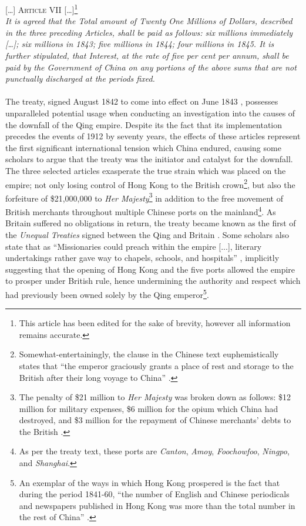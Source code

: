 \documentclass{article}
\newcommand{\textrule}{\noindent\makebox[\linewidth]{\rule{\linewidth}{0.4pt}}}
\begin{document}
{\centering \textsc{[\ldots] Article VII [\ldots]}\footnote{This article has been edited for the sake of brevity, however all information remains accurate.} \\[1em]}
\textit{It is agreed that the Total amount of Twenty One Millions of Dollars, described in the three preceding Articles, shall be paid as follows: six millions immediately \emph{[\ldots]}; six millions in 1843; five millions in 1844; four millions in 1845. It is further stipulated, that Interest, at the rate of five per cent per annum, shall be paid by the Government of China on any portions of the above sums that are not punctually discharged at the periods fixed.} \\[0.6em]
\textrule \\

The treaty, signed  August 1842 to come into effect on  June 1843
\autocite{Wright:2007}, possesses unparalleled potential usage when conducting an investigation into the causes of the downfall of the Qing empire. Despite its the fact that its implementation precedes the events of 1912 by seventy years, the effects of these articles represent the first significant international tension which China endured, causing some scholars to argue that the treaty was the initiator and catalyst for the downfall. The three selected articles exasperate the true strain which was placed on the empire; not only losing control of Hong Kong to the British crown\footnote{Somewhat-entertainingly, the clause in the Chinese text euphemistically states that ``the emperor graciously grants a place of rest and storage to the British after their long voyage to China''
\autocite{Zhang:2007}.}, but also the forfeiture of \$21,000,000 to \textit{Her Majesty}\footnote{The penalty of \$21 million to \textit{Her Majesty} was broken down as follows: \$12 million for military expenses, \$6 million for the opium which China had destroyed, and \$3 million for the repayment of Chinese merchants' debts to the British
\autocite{Hsu:1999}.} in addition to the free movement of British merchants throughout multiple Chinese ports on the mainland\footnote{As per the treaty text, these ports are \textit{Canton}, \textit{Amoy}, \textit{Foochowfoo}, \textit{Ningpo}, and \textit{Shanghai}.}. As Britain suffered no obligations in return, the treaty became known as the first of the \textit{Unequal Treaties} signed between the Qing and Britain
\autocite{Hoe:1999}. Some scholars also state that as ``Missionaries could preach within the empire [...], literary undertakings rather gave way to chapels, schools, and hospitals''
\autocite{Britton:1933}, implicitly suggesting that the opening of Hong Kong and the five ports allowed the empire to prosper under British rule, hence undermining the authority and respect which had previously been owned solely by the Qing emperor\footnote{An exemplar of the ways in which Hong Kong prospered is the fact that during the period 1841-60, ``the number of English and Chinese periodicals and newspapers published in Hong Kong was more than the total number in the rest of China''
\autocite{Huang:2001}.}.
\end{document}
